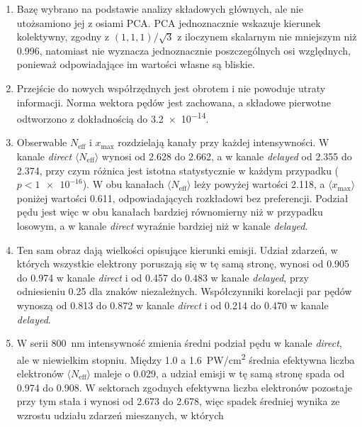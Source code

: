\documentclass[12pt,a4paper]{article}
\newcommand{\Neff}{N_{\mathrm{eff}}}
\newcommand{\xmax}{x_{\max}}
\newcommand{\PWcm}{PW/cm\textsuperscript{2}}
\begin{document}
\begin{enumerate}
  \item Bazę wybrano na podstawie analizy składowych głównych, ale
        nie utożsamiono jej z osiami PCA. PCA jednoznacznie wskazuje
        kierunek kolektywny, zgodny z $(1,1,1)/\sqrt3$ z iloczynem
        skalarnym nie mniejszym niż \num{0.996}, natomiast nie wyznacza jednoznacznie
        poszczególnych osi względnych, ponieważ odpowiadające im
        wartości własne są bliskie.
  \item Przejście do nowych współrzędnych jest obrotem i nie powoduje
        utraty informacji. Norma wektora pędów jest zachowana, a
        składowe pierwotne odtworzono z dokładnością do \num{3.2e-14}.
  \item Obserwable $\Neff$ i $\xmax$ rozdzielają kanały przy każdej
        intensywności. W kanale \emph{direct} $\langle\Neff\rangle$
        wynosi od \num{2.628} do \num{2.662}, a w kanale \emph{delayed}
        od \num{2.355} do \num{2.374}, przy czym różnica jest istotna
        statystycznie w każdym przypadku ($p<\num{1e-16}$). W obu
        kanałach $\langle\Neff\rangle$ leży powyżej wartości
        \num{2.118}, a $\langle\xmax\rangle$ poniżej wartości
        \num{0.611}, odpowiadających rozkładowi bez preferencji. Podział
        pędu jest więc w obu kanałach bardziej równomierny niż
        w przypadku losowym, a w kanale \emph{direct} wyraźnie bardziej
        niż w kanale \emph{delayed}.
  \item Ten sam obraz dają wielkości opisujące kierunki emisji. Udział
        zdarzeń, w których wszystkie elektrony poruszają się w tę samą
        stronę, wynosi od \num{0.905} do \num{0.974} w kanale
        \emph{direct} i od \num{0.457} do \num{0.483} w kanale
        \emph{delayed}, przy odniesieniu \num{0.25} dla znaków
        niezależnych. Współczynniki korelacji par pędów wynoszą od
        \num{0.813} do \num{0.872} w kanale \emph{direct} i od
        \num{0.214} do \num{0.470} w kanale \emph{delayed}.
  \item W serii \num{800}~nm intensywność zmienia średni podział pędu
        w kanale \emph{direct}, ale w niewielkim stopniu. Między
        \num{1.0} a \num{1.6}~\PWcm{} średnia efektywna liczba
        elektronów $\langle\Neff\rangle$ maleje o \num{0.029}, a udział
        emisji w tę samą stronę spada od \num{0.974} do \num{0.908}.
        W sektorach zgodnych efektywna liczba elektronów pozostaje przy
        tym stała i wynosi od \num{2.673} do \num{2.678}, więc spadek
        średniej wynika ze wzrostu udziału zdarzeń mieszanych, w których

\end{enumerate}
\end{document}
